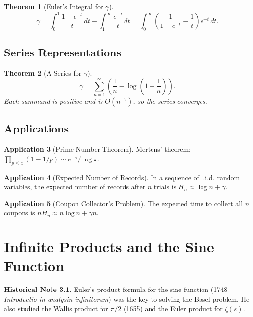 \documentclass[11pt,a4paper,twoside]{book}
\theoremstyle{eulerstyle}
\newtheorem{theorem}{Theorem}[chapter]
\theoremstyle{definition}
\newtheorem{historical}[theorem]{Historical Note}
\newtheorem{application}[theorem]{Application}
\begin{document}
\begin{theorem}[Euler's Integral for $\gamma$]
\[
\gamma = \int_0^1 \frac{1 - e^{-t}}{t}\, dt - \int_1^\infty \frac{e^{-t}}{t}\, dt
= \int_0^\infty \left(\frac{1}{1-e^{-t}} - \frac{1}{t}\right) e^{-t}\, dt.
\]
\end{theorem}

\section{Series Representations}

\begin{theorem}[A Series for $\gamma$]
\[
\gamma = \sum_{n=1}^\infty \left(\frac{1}{n} - \log\left(1+\frac{1}{n}\right)\right).
\]
Each summand is positive and is $O(n^{-2})$, so the series converges.
\end{theorem}

\section{Applications}

\begin{application}[Prime Number Theorem]
Mertens' theorem: $\prod_{p \le x} (1 - 1/p) \sim e^{-\gamma}/\log x$.
\end{application}

\begin{application}[Expected Number of Records]
In a sequence of i.i.d. random variables, the expected number of records after $n$ trials is $H_n \approx \log n + \gamma$.
\end{application}

\begin{application}[Coupon Collector's Problem]
The expected time to collect all $n$ coupons is $n H_n \approx n \log n + \gamma n$.
\end{application}

\cleardoublepage

\chapter{Infinite Products and the Sine Function}
\label{ch:products}

\begin{historical}
Euler's product formula for the sine function (1748, \emph{Introductio in analysin infinitorum}) was the key to solving the Basel problem. He also studied the Wallis product for $\pi/2$ (1655) and the Euler product for $\zeta(s)$. \cite{euler1748}\end{historical}
\end{document}
